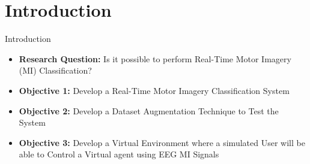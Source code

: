 \section{Introduction}
\begin{frame}{Introduction}
\begin{itemize}
    \item \textbf{Research Question:} Is it possible to perform Real-Time Motor Imagery (MI) Classification?
    \item \textbf{Objective 1:} Develop a Real-Time Motor Imagery Classification System
    \item \textbf{Objective 2:} Develop a Dataset Augmentation Technique to Test the System
    \item \textbf{Objective 3:} Develop a Virtual Environment where a simulated User will be able to Control a Virtual agent using EEG MI Signals
\end{itemize}
\end{frame}